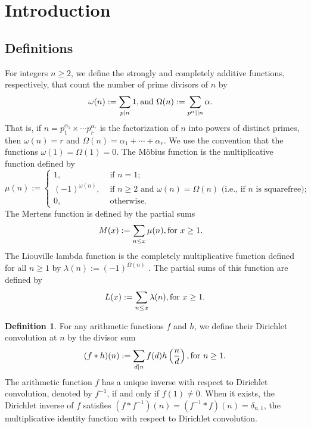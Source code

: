 \documentclass[11pt,reqno,a4letter]{article}
\numberwithin{equation}{section}
\numberwithin{figure}{section}
\numberwithin{table}{section}
\newcommand{\seqnum}[1]{\href{http://oeis.org/#1}{\color{ProcessBlue}{\underline{#1}}}}
\theoremstyle{plain}
\numberwithin{theorem}{section}
\theoremstyle{definition}
\newtheorem{definition}[theorem]{Definition}
\theoremstyle{remark}
\newcommand{\mathtext}[1]{\text{\rm #1}}
\begin{document}
\newpage
\renewcommand{\contentsname}{Article Index}
\setcounter{tocdepth}{2}
\tableofcontents

\newpage
\section{Introduction} 
\label{subSection_MertensMxClassical_Intro} 
\label{example_InvertingARecRelForMx_Intro}

\subsection{Definitions}

For integers $n \geq 2$, we define the strongly and 
completely additive functions, respectively, 
that count the number of prime divisors of $n$ by 
\begin{align*}
\omega(n) & := \sum_{p|n} 1, \mathtext{ and } 
\Omega(n) := \sum_{p^{\alpha} \mid\mid n} \alpha. 
\end{align*}
That is, if $n = p_1^{\alpha_1} \times \cdots p_r^{\alpha_r}$ is the 
factorization of $n$ into powers of distinct primes, then 
$\omega(n) = r$ and $\Omega(n) = \alpha_1 + \cdots + \alpha_r$. 
We use the convention that the functions $\omega(1) = \Omega(1) = 0$. 
The M\"obius function is the multiplicative function defined by 
\cite[\seqnum{A008683}]{OEIS}
\[
\mu(n) := \begin{cases} 
	1, & \text{ if $n = 1$}; \\ 
	(-1)^{\omega(n)}, & \text{ if $n \geq 2$ and $\omega(n) = \Omega(n)$ (i.e., if $n$ is squarefree);} \\ 
	0, & \text{ otherwise.}
        \end{cases}
\]
The Mertens function is defined by the partial sums 
\cite[\seqnum{A002321}]{OEIS} 
\begin{align} 
M(x) & := \sum_{n \leq x} \mu(n), \mathtext{ for } x \geq 1. 
\end{align} 
The Liouville lambda function is the completely multiplicative function 
defined for all $n \geq 1$ by $\lambda(n) := (-1)^{\Omega(n)}$ 
\cite[\seqnum{A008836}]{OEIS}. 
The partial sums of this function are defined by 
\cite[\seqnum{A002819}]{OEIS}
\begin{equation}
\label{eqn_LxSummatoryFuncDef_v1}
L(x) := \sum\limits_{n \leq x} \lambda(n), \mathtext{ for } x \geq 1. 
\end{equation}

\begin{definition}
For any arithmetic functions $f$ and $h$, we define their 
Dirichlet convolution at $n$ by the divisor sum 
\[
(f \ast h)(n) := \sum_{d|n} f(d) h\left(\frac{n}{d}\right), \mathtext{ for } n \geq 1.
\]
The arithmetic function $f$ has a unique inverse with respect to Dirichlet convolution, 
denoted by $f^{-1}$, if and only if $f(1) \neq 0$. 
When it exists, the Dirichlet inverse of $f$ satisfies 
$(f \ast f^{-1})(n) = (f^{-1} \ast f)(n) = \delta_{n,1}$, the 
multiplicative identity function with respect to Dirichlet convolution. 
\end{definition}
\end{document}
